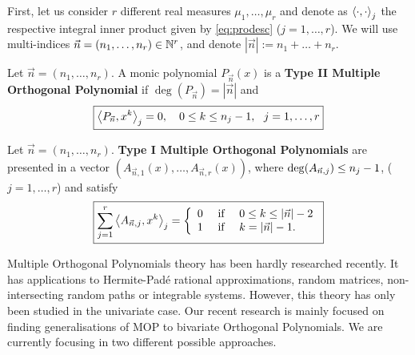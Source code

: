 \documentclass[portrait,final,a0paper,fontscale=0.38]{baposter}
\begin{document}
\begin{poster}
{\begin{multicols}{2}
  First, let us consider $r$ different real measures $\mu_1,\dots,\mu_r$ and denote as $\left\langle \cdot , \cdot \right\rangle_j$ the respective integral inner product given by \eqref{eq:prodesc} ($j=1,\dots,r$). We will use multi-indices $\vec n = (n_1, \dots,n_r)\in \mathbb{N}^r$, and denote $|\vec n| := n_1 + \dots + n_r$. 
    \begin{definition}
      Let $\vec n = (n_1,\dots,n_r)$. A monic polynomial $P_{\vec n}(x)$ is a \textbf{Type II Multiple Orthogonal Polynomial} if $\deg(P_{\vec n})= |\vec n|$ and 
      \begin{equation}
        \label{eq:typeII-MOP-dot}
        \boxed{\left\langle P_{\vec n} , x^k \right\rangle_j = 0, \ \ \ 0\leq k \leq n_{j}-1, \ \ j = 1,\dots,r}
    \end{equation}
  \end{definition}

  \begin{definition}
    \label{def:typeI-univar}
    Let $\vec n = (n_1,\dots,n_r)$. \textbf{Type I Multiple Orthogonal Polynomials} are presented in a vector $(A_{\vec n, 1}(x), \dots, A_{\vec n, r}(x))$, where $\deg(A_{\vec n, j})\leq\nolinebreak n_j-1$, ($j=1,\dots,r$) and satisfy
    \begin{equation}
      \label{eq:typeI-MOP-dot}
      \boxed{\sum_{j=1}^r \left\langle A_{\vec n,j} , x^k \right\rangle_j = \left\{\begin{array}{ccl}
          0 &   \text{ if } & 0\leq k\leq |\vec n|-2 \\
          1 & \text{ if } & k=|\vec n|-1.      
      \end{array}\right.}
    \end{equation}
  \end{definition}

  Multiple Orthogonal Polynomials theory has been hardly researched recently. It has applications to Hermite-Padé rational approximations, random matrices, non-intersecting random paths or integrable systems. However, this theory has only been studied in the univariate case. Our recent research is mainly focused on finding generalisations of MOP to bivariate Orthogonal Polynomials. We are currently focusing in two different possible approaches.  
  
  \end{multicols}
	}
%
%


\end{poster}
\end{document}
